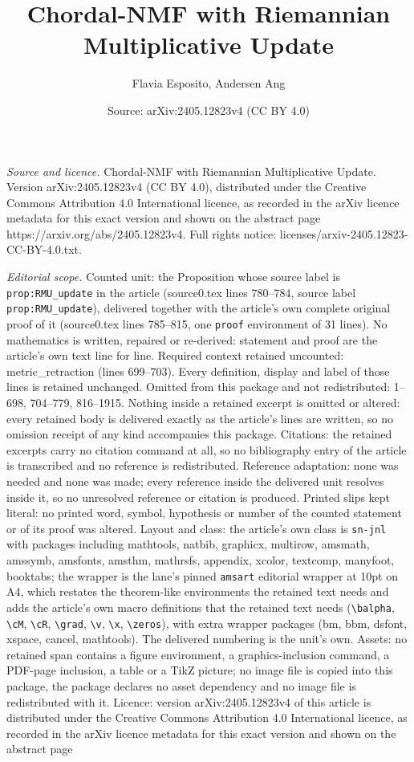 \documentclass[10pt,a4paper]{amsart}
\title[Chordal-NMF with Riemannian Multiplicative Update]{Chordal-NMF with Riemannian Multiplicative Update}
\author{Flavia Esposito, Andersen Ang}
\date{Source: arXiv:2405.12823v4 (CC BY 4.0)}
\begin{document}
\maketitle

\noindent\emph{Source and licence.} Chordal-NMF with Riemannian Multiplicative Update. Version arXiv:2405.12823v4 (CC BY 4.0), distributed under the Creative Commons Attribution 4.0 International licence, as recorded in the arXiv licence metadata for this exact version and shown on the abstract page https://arxiv.org/abs/2405.12823v4. Full rights notice: licenses/arxiv-2405.12823-CC-BY-4.0.txt.\par\smallskip

\noindent\textit{Editorial scope.} Counted unit: the Proposition whose source label is \texttt{prop:RMU\_update} in the article (source0.tex lines 780--784, source label \texttt{prop:RMU\_update}), delivered together with the article's own complete original proof of it (source0.tex lines 785--815, one \texttt{proof} environment of 31 lines). No mathematics is written, repaired or re-derived: statement and proof are the article's own text line for line. Required context retained uncounted: metric\_retraction (lines 699--703). Every definition, display and label of those lines is retained unchanged. Omitted from this package and not redistributed: 1--698, 704--779, 816--1915. Nothing inside a retained excerpt is omitted or altered: every retained body is delivered exactly as the article's lines are written, so no omission receipt of any kind accompanies this package. Citations: the retained excerpts carry no citation command at all, so no bibliography entry of the article is transcribed and no reference is redistributed. Reference adaptation: none was needed and none was made; every reference inside the delivered unit resolves inside it, so no unresolved reference or citation is produced. Printed slips kept literal: no printed word, symbol, hypothesis or number of the counted statement or of its proof was altered. Layout and class: the article's own class is \texttt{sn-jnl} with packages including mathtools, natbib, graphicx, multirow, amsmath, amssymb, amsfonts, amsthm, mathrsfs, appendix, xcolor, textcomp, manyfoot, booktabs; the wrapper is the lane's pinned \texttt{amsart} editorial wrapper at 10pt on A4, which restates the theorem-like environments the retained text needs and adds the article's own macro definitions that the retained text needs (\texttt{\textbackslash balpha}, \texttt{\textbackslash cM}, \texttt{\textbackslash cR}, \texttt{\textbackslash grad}, \texttt{\textbackslash v}, \texttt{\textbackslash x}, \texttt{\textbackslash zeros}), with extra wrapper packages (bm, bbm, dsfont, xspace, cancel, mathtools). The delivered numbering is the unit's own. Assets: no retained span contains a figure environment, a graphics-inclusion command, a PDF-page inclusion, a table or a TikZ picture; no image file is copied into this package, the package declares no asset dependency and no image file is redistributed with it. Licence: version arXiv:2405.12823v4 of this article is distributed under the Creative Commons Attribution 4.0 International licence, as recorded in the arXiv licence metadata for this exact version and shown on the abstract page 
\end{document}
